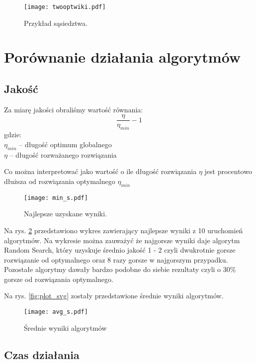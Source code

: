 \documentclass{article}
\begin{document}
\begin{figure} 
\begin{center}
\texttt{[image: twooptwiki.pdf]}
\end{center}
\caption{Przykład sąsiedztwa.}
\label{fig:schemat}
\end{figure}


\section{Porównanie działania algorytmów}


\subsection{Jakość}
Za miarę jakości obraliśmy wartość równania:
$$ \frac{\eta}{\eta_{min}}-1 $$
gdzie:\\
$\eta_{min}$ -- długość optimum globalnego \\
$\eta$ -- długość rozważanego rozwiązania

Co można interpretować jako wartość o ile długość rozwiązania $\eta$ jest procentowo dłuższa od rozwiązania optymalnego $\eta_{min}$

\begin{figure}[h!]
\begin{center}
\texttt{[image: min\_s.pdf]}
\end{center}
\caption{Najlepsze uzyskane wyniki.}
\label{fig:plot_min}
\end{figure}

Na rys. \ref{fig:plot_min} przedstawiono wykres zawierający najlepsze wyniki z 10 uruchomień algorytmów. Na wykresie można zauważyć że najgorsze wyniki daje algorytm Random Search, który uzyskuje średnio jakość 1 - 2 czyli dwukrotnie gorsze rozwiązanie od optymalnego oraz 8 razy gorsze w najgorszym przypadku. Pozostałe algorytmy dawały bardzo podobne do siebie rezultaty czyli o 30\% gorsze od rozwiązania optymalnego.


Na rys. \ref{fig:plot_svg} zostały przedstawione średnie wyniki algorytmów.

\begin{figure} 
\begin{center}
\texttt{[image: avg\_s.pdf]}
\end{center}
\caption{Średnie wyniki algorytmów}
\label{fig:plot_avg}
\end{figure}

\subsection{Czas działania}
\end{document}
